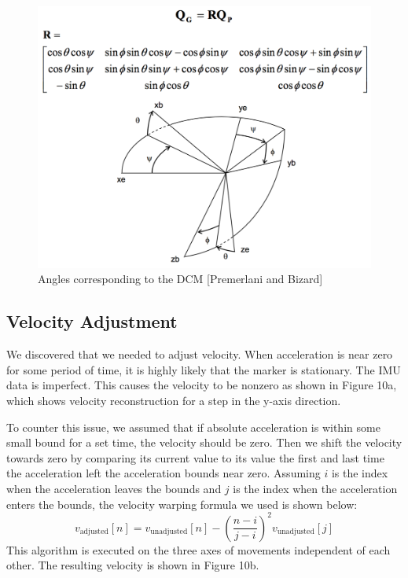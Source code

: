 \documentclass[10pt,journal]{IEEEtran}
\begin{document}
\begin{figure}[h]
    \includegraphics[width=\linewidth]{figures/dcm}
  \caption{Angles corresponding to the DCM [Premerlani and Bizard]}
  \label{fig:vel-adjust}
\end{figure}

\subsection{Velocity Adjustment}
	We discovered that we needed to adjust velocity. When acceleration is near zero for some period of time, it is highly likely that the marker is stationary. The IMU data is imperfect. This causes the velocity to be nonzero as shown in Figure 10a, which shows velocity reconstruction for a step in the y-axis direction.
\par To counter this issue, we assumed that if absolute acceleration is within some small bound for a set time, the velocity should be zero. Then we shift the velocity towards zero by comparing its current value to its value the first and last time the acceleration left the acceleration bounds near zero. Assuming $i$ is the index when the acceleration leaves the bounds and $j$ is the index when the acceleration enters the bounds, the velocity warping formula we used is shown below:
$$v_{\text{adjusted}}[n] = v_{\text{unadjusted}}[n] - \left(\frac{n-i}{j-i}\right)^2 v_{\text{unadjusted}}[j]$$
This algorithm is executed on the three axes of movements independent of each other. The resulting velocity is shown in Figure 10b.
\end{document}
